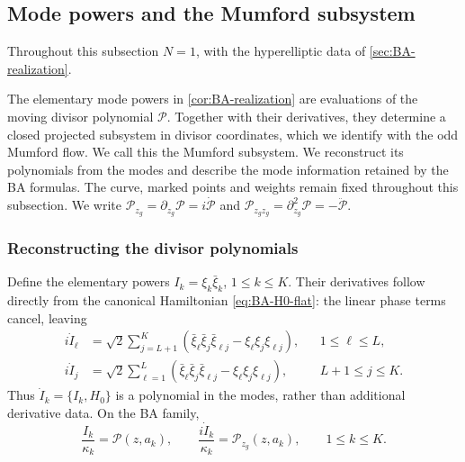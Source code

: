 \subsection{Mode powers and the Mumford subsystem}
\label{sec:mumford-correspondence}

Throughout this subsection $N=1$, with the hyperelliptic data of
\cref{sec:BA-realization}.

The elementary mode powers in \cref{cor:BA-realization} are
evaluations of the moving divisor polynomial $\mathcal P$. Together
with their derivatives, they determine a closed projected subsystem
in divisor coordinates, which we identify with the odd Mumford flow.
We call this the Mumford subsystem. We reconstruct its polynomials
from the modes and describe the mode information retained by the
BA formulas. The curve, marked points and weights remain fixed throughout this subsection. We write $\mathcal P_{z_g}=\partial_{z_g}\mathcal P=i\dot{\mathcal P}$ and
$\mathcal P_{z_gz_g}=\partial_{z_g}^2\mathcal P=-\ddot{\mathcal P}$.

\subsubsection{Reconstructing the divisor polynomials}

Define the elementary powers $I_k=\xi_k\bar{\xi}_k$, $1\leq k\leq K$.
Their derivatives follow directly from the canonical Hamiltonian
\cref{eq:BA-H0-flat}: the linear phase terms cancel, leaving
\begin{equation}\label{eq:mumford-power-rates}
\begin{aligned}
 i\dot I_{\ell}&=\sqrt2\sum_{j=L+1}^{K}
 (\bar{\xi}_{\ell}\bar{\xi}_j\bar{\xi}_{\ell j}-\xi_{\ell}\xi_j\xi_{\ell j}),&&1\leq\ell\leq L,\\
 i\dot I_j&=\sqrt2\sum_{\ell=1}^{L}
 (\bar{\xi}_{\ell}\bar{\xi}_j\bar{\xi}_{\ell j}-\xi_{\ell}\xi_j\xi_{\ell j}),&&L+1\leq j\leq K.
\end{aligned}
\end{equation}
Thus $\dot I_k=\{I_k,H_0\}$ is a polynomial in the modes, rather
than additional derivative data. On the BA family,
\begin{equation}\label{eq:mumford-evaluations}
 \frac{I_k}{\kappa_k}=\mathcal P(z,a_k),\qquad
 \frac{i\dot I_k}{\kappa_k}=\mathcal P_{z_g}(z,a_k),
 \qquad1\leq k\leq K.
\end{equation}

